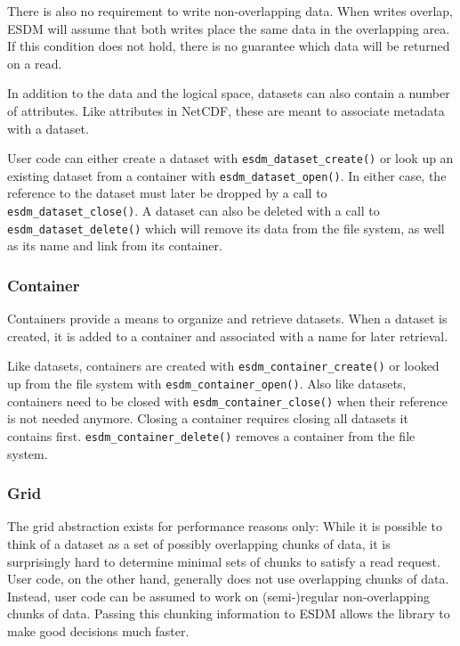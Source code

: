There is also no requirement to write non-overlapping data. When writes overlap, ESDM will assume that both writes place the same data in the overlapping area. 
If this condition does not hold, there is no guarantee which data will be returned on a read.

In addition to the data and the logical space, datasets can also contain a number of attributes. 
Like attributes in NetCDF, these are meant to associate metadata with a dataset.

User code can either create a dataset with \lstinline|esdm_dataset_create()| or look up an existing dataset from a container with \lstinline|esdm_dataset_open()|. 
In either case, the reference to the dataset must later be dropped by a call to \lstinline|esdm_dataset_close()|. 
A dataset can also be deleted with a call to \lstinline|esdm_dataset_delete()| which will remove its data from the file system, as well as its name and link from its container.

\subsubsection{Container}%
\label{sec:user-guides:container}

Containers provide a means to organize and retrieve datasets. 
When a dataset is created, it is added to a container and associated with a name for later retrieval.

Like datasets, containers are created with \lstinline|esdm_container_create()| or looked up from the file system with \lstinline|esdm_container_open()|. 
Also like datasets, containers need to be closed with \lstinline|esdm_container_close()| when their reference is not needed anymore.
Closing a container requires closing all datasets it contains first. 
\lstinline|esdm_container_delete()| removes a container from the file system.

\subsubsection{Grid}%
\label{sec:user-guides:grid}

The grid abstraction exists for performance reasons only: While it is possible to think of a dataset as a set of possibly overlapping chunks of data, it is surprisingly hard to determine minimal sets of chunks to satisfy a read request. 
User code, on the other hand, generally does not use overlapping chunks of data. 
Instead, user code can be assumed to work on (semi-)regular non-overlapping chunks of data. 
Passing this chunking information to ESDM allows the library to make good decisions much faster.

